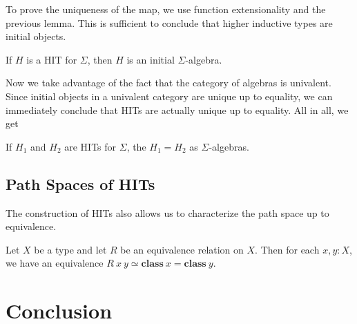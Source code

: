 \documentclass[9pt]{entcs}
\newcommand{\constructor}[1]{\mathbf{#1}}
\newcommand{\0}{\textbf{0}} %
\newcommand{\1}{\textbf{1}} %
\newcommand{\weq}{\simeq} %
\newcommand{\classof}{\constructor{class}} %
\begin{document}
To prove the uniqueness of the map, we use function extensionality and the previous lemma.
This is sufficient to conclude that higher inductive types are initial objects.

\begin{proposition}
If $H$ is a HIT for $\Sigma$, then $H$ is an initial $\Sigma$-algebra.
\end{proposition}

Now we take advantage of the fact that the category of algebras is univalent.
Since initial objects in a univalent category are unique up to equality, we can immediately conclude that HITs are actually unique up to equality.
All in all, we get

\begin{theorem}
If $H_1$ and $H_2$ are HITs for $\Sigma$, the $H_1 = H_2$ as $\Sigma$-algebras.
\end{theorem}

\subsection{Path Spaces of HITs}
The construction of HITs also allows us to characterize the path space up to equivalence.

\begin{proposition}
Let $X$ be a type and let $R$ be an equivalence relation on $X$.
Then for each $x, y : X$, we have an equivalence $R \> x \> y \weq \classof \> x = \classof \> y$.
\end{proposition}

\section{Conclusion}
\end{document}
